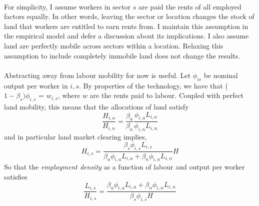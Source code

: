 \documentclass[]{article}
\theoremstyle{plain}
\begin{document}
\paragraph*{}
For simplicity, I assume workers in sector $s$ are paid the rents of all employed factors equally. In other words, leaving the sector or location changes the stock of land that workers are entitled to earn rents from. I maintain this assumption in the empirical model and defer a discussion about its implications. I also assume land are perfectly mobile across sectors within a location. Relaxing this assumption to include completely immobile land does not change the results.
\paragraph*{} 
Abstracting away from labour mobility for now is useful. Let $\phi_{is}$ be nominal output per worker in $i,s$. By properties of the technology, we have that ($1-\beta_{s})\phi_{i,s}$ = $w_{i,s}$, where $w$ are the rents paid to labour. Coupled with perfect land mobility, this means that the allocations of land satisfy
\begin{equation*}
	\frac{H_{i,a}}{H_{i,n}} = \frac{\beta_{a}}{\beta_{n}}\frac{\phi_{i,a}L_{i, a}}{\phi_{i,n}L_{i, n}}
\end{equation*}
and in particular land market clearing implies,
\begin{equation*}
	H_{i,s} = \frac{\beta_{s}\phi_{i,s}L_{i, s}}{\beta_{a}\phi_{i,a}L_{i, a} + \beta_{n}\phi_{i,n}L_{i, n}}H
\end{equation*}
So that the \textit{employment density} as a function of labour and output per worker satisfies
\begin{equation}
	\frac{L_{i, s}}{H_{i, s}} = \frac{\beta_{a}\phi_{i,a}L_{i, a} + \beta_{n}\phi_{i,n}L_{i, n}}{\beta_{s}\phi_{i,s}H}
\end{equation}
\end{document}
